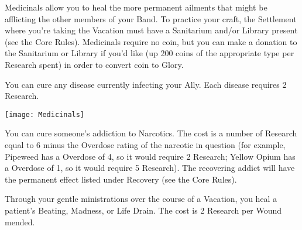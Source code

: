 

Medicinals allow you to heal the more permanent ailments that might be afflicting the other members of your Band.   To practice your craft, the Settlement where you're taking the Vacation must have a Sanitarium and/or Library present (see the Core Rules).  Medicinals require no coin, but you can make a donation to the Sanitarium or Library if you'd like (up 200 coins of the appropriate type per Research spent) in order to convert coin to Glory.



You can cure any disease currently infecting your Ally.  Each disease requires 2 Research.

  \begin{center}
  \texttt{[image: Medicinals]}
  \end{center}

\cbreak




You can cure someone's addiction to Narcotics.  The cost is a number of Research equal to 6 minus the \MAX Overdose rating of the narcotic in question (for example, Pipeweed has a \MAX Overdose of 4, so it would require 2 Research; Yellow Opium has a \MAX Overdose of 1, so it would require 5 Research).  The recovering addict will have the permanent effect listed under Recovery (see the Core Rules).




Through your gentle ministrations over the course of a Vacation, you heal a patient's Beating, Madness, or Life Drain.  The cost is 2 Research per Wound mended.

